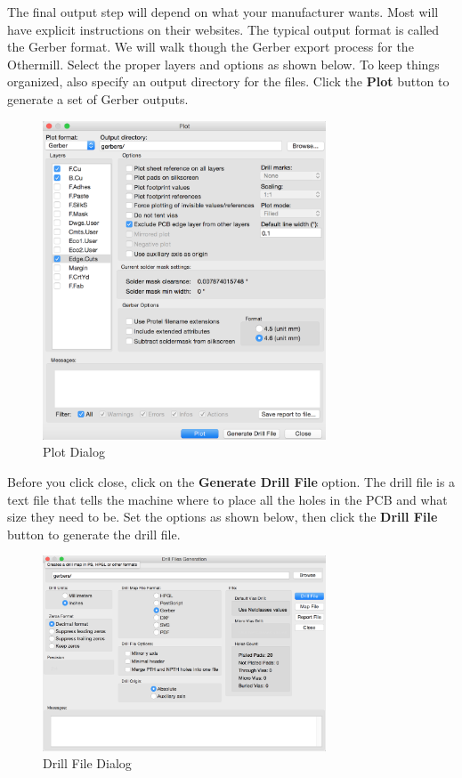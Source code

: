 \documentclass[12pt, oneside]{article}
\begin{document}
The final output step will depend on what your manufacturer wants. Most will have explicit instructions on their websites. The typical output format is called the Gerber format. We will walk though the Gerber export process for the Othermill. Select the proper layers and options as shown below. To keep things organized, also specify an output directory for the files. Click the \textbf{Plot} button to generate a set of Gerber outputs.

\begin{figure}[H]
\includegraphics[width=0.75\textwidth]{Gerbers}
\centering
\caption{Plot Dialog}
\end{figure}

Before you click close, click on the \textbf{Generate Drill File} option. The drill file is a text file that tells the machine where to place all the holes in the PCB and what size they need to be. Set the options as shown below, then click the \textbf{Drill File} button to generate the drill file.

\begin{figure}[H]
\includegraphics[width=0.75\textwidth]{DrillFile}
\centering
\caption{Drill File Dialog}
\end{figure}
\end{document}
